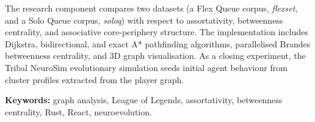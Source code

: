 The research component compares two datasets (a Flex Queue corpus, \textit{flexset}, and
a Solo Queue corpus, \textit{soloq}) with respect to assortativity, betweenness centrality,
and associative core-periphery structure. The implementation includes Dijkstra, bidirectional,
and exact A* pathfinding algorithms, parallelised Brandes betweenness centrality, and 3D
graph visualisation. As a closing experiment, the Tribal NeuroSim evolutionary simulation
seeds initial agent behaviour from cluster profiles extracted from the player graph.

\textbf{Keywords:} graph analysis, League of Legends, assortativity, betweenness centrality,
Rust, React, neuroevolution.

\tableofcontents
\clearpage
